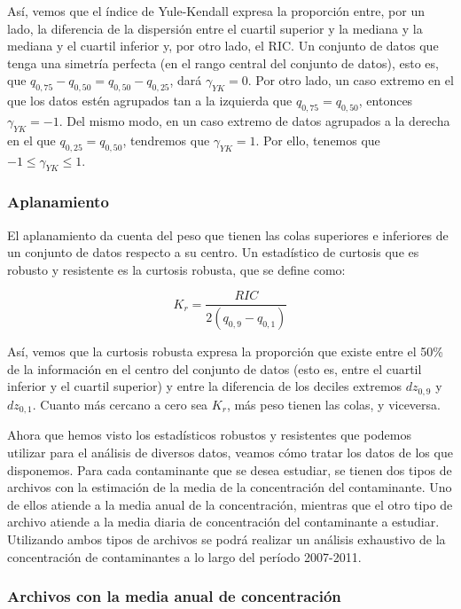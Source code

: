 \documentclass[12pt]{article}
\begin{document}
Así, vemos que el índice de Yule-Kendall expresa la proporción entre, por un lado, la diferencia de la dispersión entre el cuartil superior y la mediana y la mediana y el cuartil inferior y, por otro lado, el RIC. Un conjunto de datos que tenga una simetría perfecta (en el rango central del conjunto de datos), esto es, que $q_{0,75} - q_{0,50} = q_{0,50} - q_{0,25}$, dará $\gamma_{YK} = 0$. Por otro lado, un caso extremo en el que los datos estén agrupados tan a la izquierda que $q_{0,75} = q_{0,50}$, entonces $\gamma_{YK} = -1$. Del mismo modo, en un caso extremo de datos agrupados a la derecha en el que $q_{0,25} = q_{0,50}$, tendremos que $\gamma_{YK} = 1$. Por ello, tenemos que $-1 \leq \gamma_{YK} \leq 1$.

\subsubsection{Aplanamiento}

El aplanamiento da cuenta del peso que tienen las colas superiores e inferiores de un conjunto de datos respecto a su centro. Un estadístico de curtosis que es robusto y resistente es la curtosis robusta, que se define como:

\begin{equation}
K_{r} = \frac{RIC}{2 (q_{0,9} - q_{0,1})}
\label{eq:robust-kurtosis}
\end{equation}

Así, vemos que la curtosis robusta expresa la proporción que existe entre el 50\% de la información en el centro del conjunto de datos (esto es, entre el cuartil inferior y el cuartil superior) y entre la diferencia de los deciles extremos $dz_{0,9}$ y $dz_{0,1}$. Cuanto más cercano a cero sea $K_{r}$, más peso tienen las colas, y viceversa.

Ahora que hemos visto los estadísticos robustos y resistentes que podemos utilizar para el análisis de diversos datos, veamos cómo tratar los datos de los que disponemos. Para cada contaminante que se desea estudiar, se tienen dos tipos de archivos con la estimación de la media de la concentración del contaminante. Uno de ellos atiende a la media anual de la concentración, mientras que el otro tipo de archivo atiende a la media diaria de concentración del contaminante a estudiar. Utilizando ambos tipos de archivos se podrá realizar un análisis exhaustivo de la concentración de contaminantes a lo largo del período 2007-2011.

\subsubsection{Archivos con la media anual de concentración}
\end{document}
